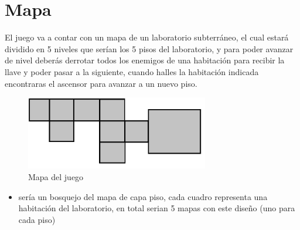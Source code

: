 \documentclass{article}
\begin{document}
\section{Mapa}\label{mapa}
El juego va a contar con un mapa de un laboratorio subterráneo, el cual estará dividido en 5 niveles que serían los 5 pisos del laboratorio, y para poder avanzar de nivel deberás derrotar todos los enemigos de una habitación para recibir la llave y poder pasar a la siguiente, cuando halles la habitación indicada encontraras el ascensor para avanzar a un nuevo piso. 

\begin{figure}[h]
\includegraphics[width=8cm]{01.png}
\centering
\caption{Mapa del juego}
\label{fig:cpplogo}
\end{figure}

\begin{itemize}
    \item  sería un bosquejo del mapa de capa piso, cada cuadro representa una habitación del laboratorio, en total serian 5 mapas con este diseño (uno para cada piso)
\end{itemize}
\newpage
\end{document}

